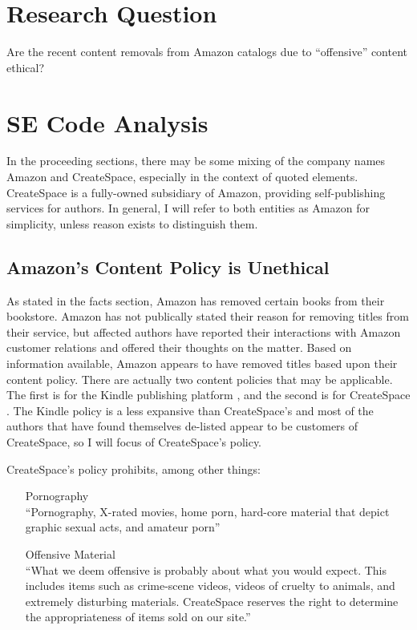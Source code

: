 \documentclass[10pt]{article}
\begin{document}
\begin{multicols}{2}
\begin{itemize}
\end{itemize}

\section{Research Question}
Are the recent content removals from Amazon catalogs due to ``offensive'' content ethical?

\section{SE Code Analysis}

In the proceeding sections, there may be some mixing of the company names Amazon and CreateSpace, especially in the context of quoted elements.  CreateSpace is a fully-owned subsidiary of Amazon, providing self-publishing services for authors.  In general, I will refer to both entities as Amazon for simplicity, unless reason exists to distinguish them.

\subsection{Amazon's Content Policy is Unethical}

As stated in the facts section, Amazon has removed certain books from their bookstore.  Amazon has not publically stated their reason for removing titles from their service, but affected authors have reported their interactions with Amazon customer relations and offered their thoughts on the matter.  Based on information available, Amazon appears to have removed titles based upon their content policy.  There are actually two content policies that may be applicable.  The first is for the Kindle publishing platform \cite{AmazonDTPContentGuidelines}, and the second is for CreateSpace \cite{CreateSpaceContentGuidelines}.  The Kindle policy is a less expansive than CreateSpace's and most of the authors that have found themselves de-listed appear to be customers of CreateSpace, so I will focus of CreateSpace's policy.

CreateSpace's policy prohibits, among other things:

\begin{itemize}
\item[Pornography] \hfill \\
      ``Pornography, X-rated movies, home porn, hard-core material that depict graphic sexual acts, and amateur porn''
\item[Offensive Material] \hfill \\
      ``What we deem offensive is probably about what you would expect. This includes items such as crime-scene videos, videos of cruelty to animals, and extremely disturbing materials. CreateSpace reserves the right to determine the appropriateness of items sold on our site.''


\end{itemize}
\end{multicols}
\end{document}

